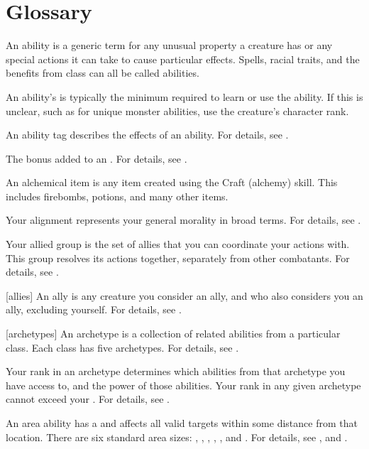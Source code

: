 \chapter{Glossary}\label{Glossary}

 An ability is a generic term for any unusual property a creature has or any special actions it can take to cause particular effects.
Spells, racial traits, and the benefits from class  can all be called abilities.

 An ability's  is typically the minimum  required to learn or use the ability.
If this is unclear, such as for unique monster abilities, use the creature's character rank.

 An ability tag describes the effects of an ability.
For details, see .

 The bonus added to an .
For details, see .

 An alchemical item is any item created using the Craft (alchemy) skill.
This includes firebombs, potions, and many other items.

 Your alignment represents your general morality in broad terms.
For details, see .

 Your allied group is the set of allies that you can coordinate your actions with.
This group resolves its actions together, separately from other combatants.
For details, see .

[allies] An ally is any creature you consider an ally, and who also considers you an ally, excluding yourself.
For details, see .

[archetypes] An archetype is a collection of related abilities from a particular class.
Each class has five archetypes.
For details, see .

 Your rank in an archetype determines which abilities from that archetype you have access to, and the power of those abilities.
Your rank in any given archetype cannot exceed your .
For details, see .

 An area ability has a  and affects all valid targets within some distance from that location.
There are six standard area sizes: \tinyarea, \smallarea, \medarea, \largearea, \hugearea, and \gargarea.
For details, see , and .


